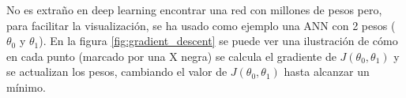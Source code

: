 No es extraño en deep learning encontrar una red con millones de pesos pero, para facilitar la visualización, se ha usado como ejemplo una ANN con 2 pesos ($\theta_0$ y $\theta_1$). En la figura \ref{fig:gradient_descent} se puede ver una ilustración de cómo en cada punto (marcado por una X negra) se calcula el gradiente de $J(\theta_0, \theta_1)$ y se actualizan los pesos, cambiando el valor de $J(\theta_0, \theta_1)$ hasta alcanzar un mínimo.

